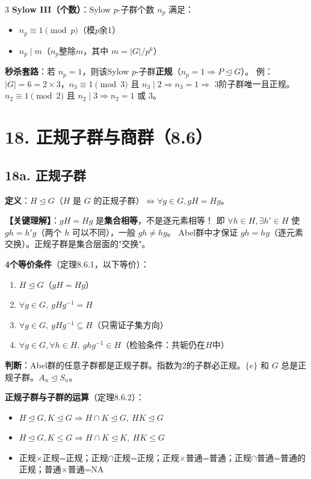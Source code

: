\documentclass[10pt,a4paper,landscape]{ctexart}
\begin{document}
\begin{multicols}{3}
\textbf{Sylow III（个数）}：Sylow $p$-子群个数 $n_p$ 满足：
\begin{itemize}
\item $n_p\equiv 1\pmod{p}$（模$p$余1）
\item $n_p\mid m$（$n_p$整除$m$，其中 $m=|G|/p^k$）
\end{itemize}

\textbf{秒杀套路}：若 $n_p=1$，则该Sylow $p$-子群\textbf{正规}（$n_p=1\Rightarrow P\trianglelefteq G$）。
例：$|G|=6=2\times 3$，$n_3\equiv 1\pmod{3}$ 且 $n_3\mid 2\Rightarrow n_3=1\Rightarrow$ 3阶子群唯一且正规。
$n_2\equiv 1\pmod{2}$ 且 $n_2\mid 3\Rightarrow n_2=1$ 或 $3$。

\section*{18. 正规子群与商群（8.6）}

\subsection*{18a. 正规子群}

\textbf{定义}：$H\trianglelefteq G$（$H$ 是 $G$ 的正规子群）$\iff\forall g\in G,gH=Hg$。

\textbf{【关键理解】}：$gH=Hg$ 是\textbf{集合相等}，不是逐元素相等！
即 $\forall h\in H,\exists h'\in H$ 使 $gh=h'g$（两个 $h$ 可以不同），一般 $gh\neq hg$。
Abel群中才保证 $gh=hg$（逐元素交换）。正规子群是集合层面的"交换"。

\textbf{4个等价条件}（定理8.6.1，以下等价）：
\begin{enumerate}[nosep,leftmargin=*]
\item $H\trianglelefteq G$（$gH=Hg$）
\item $\forall g\in G,\ gHg^{-1}=H$
\item $\forall g\in G,\ gHg^{-1}\subseteq H$（只需证子集方向）
\item $\forall g\in G,\forall h\in H,\ ghg^{-1}\in H$（检验条件：共轭仍在$H$中）
\end{enumerate}

\textbf{判断}：Abel群的任意子群都是正规子群。指数为2的子群必正规。$\{e\}$ 和 $G$ 总是正规子群。$A_n\trianglelefteq S_n$。

\textbf{正规子群与子群的运算}（定理8.6.2）：
\begin{itemize}
\item $H\trianglelefteq G,K\trianglelefteq G\Rightarrow H\cap K\trianglelefteq G,\ HK\trianglelefteq G$
\item $H\trianglelefteq G,K\leq G\Rightarrow H\cap K\trianglelefteq K,\ HK\leq G$
\item 正规$\times$正规=正规；正规$\cap$正规=正规；正规$\times$普通=普通；正规$\cap$普通=普通的正规；普通$\times$普通=NA
\end{itemize}


\end{multicols}
\end{document}
